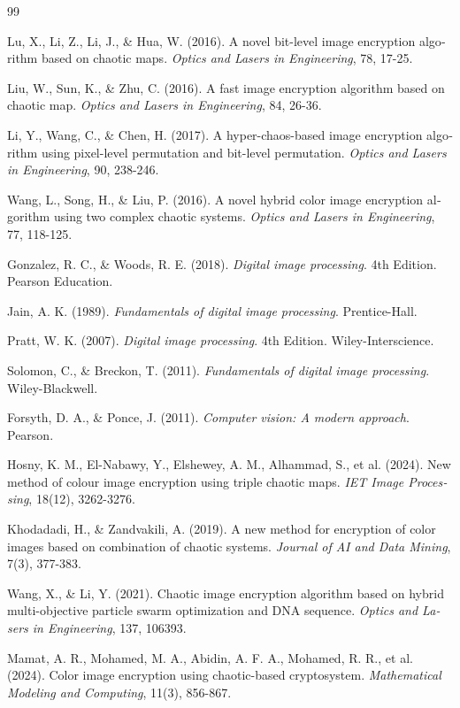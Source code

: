 \begin{thebibliography}{99}
\begin{LTRbibitems}
\begin{latin}
 Lu, X., Li, Z., Li, J., \& Hua, W. (2016). A novel bit-level image encryption algorithm based on chaotic maps. \textit{Optics and Lasers in Engineering}, 78, 17-25.

 Liu, W., Sun, K., \& Zhu, C. (2016). A fast image encryption algorithm based on chaotic map. \textit{Optics and Lasers in Engineering}, 84, 26-36.

 Li, Y., Wang, C., \& Chen, H. (2017). A hyper-chaos-based image encryption algorithm using pixel-level permutation and bit-level permutation. \textit{Optics and Lasers in Engineering}, 90, 238-246.

 Wang, L., Song, H., \& Liu, P. (2016). A novel hybrid color image encryption algorithm using two complex chaotic systems. \textit{Optics and Lasers in Engineering}, 77, 118-125.

 Gonzalez, R. C., \& Woods, R. E. (2018). \textit{Digital image processing}. 4th Edition. Pearson Education.

 Jain, A. K. (1989). \textit{Fundamentals of digital image processing}. Prentice-Hall.

 Pratt, W. K. (2007). \textit{Digital image processing}. 4th Edition. Wiley-Interscience.

 Solomon, C., \& Breckon, T. (2011). \textit{Fundamentals of digital image processing}. Wiley-Blackwell.

 Forsyth, D. A., \& Ponce, J. (2011). \textit{Computer vision: A modern approach}. Pearson.

 Hosny, K. M., El-Nabawy, Y., Elshewey, A. M., Alhammad, S., et al. (2024). New method of colour image encryption using triple chaotic maps. \textit{IET Image Processing}, 18(12), 3262-3276.

 Khodadadi, H., \& Zandvakili, A. (2019). A new method for encryption of color images based on combination of chaotic systems. \textit{Journal of AI and Data Mining}, 7(3), 377-383.

 Wang, X., \& Li, Y. (2021). Chaotic image encryption algorithm based on hybrid multi-objective particle swarm optimization and DNA sequence. \textit{Optics and Lasers in Engineering}, 137, 106393.

 Mamat, A. R., Mohamed, M. A., Abidin, A. F. A., Mohamed, R. R., et al. (2024). Color image encryption using chaotic-based cryptosystem. \textit{Mathematical Modeling and Computing}, 11(3), 856-867.


\end{latin}
\end{LTRbibitems}
\end{thebibliography}
